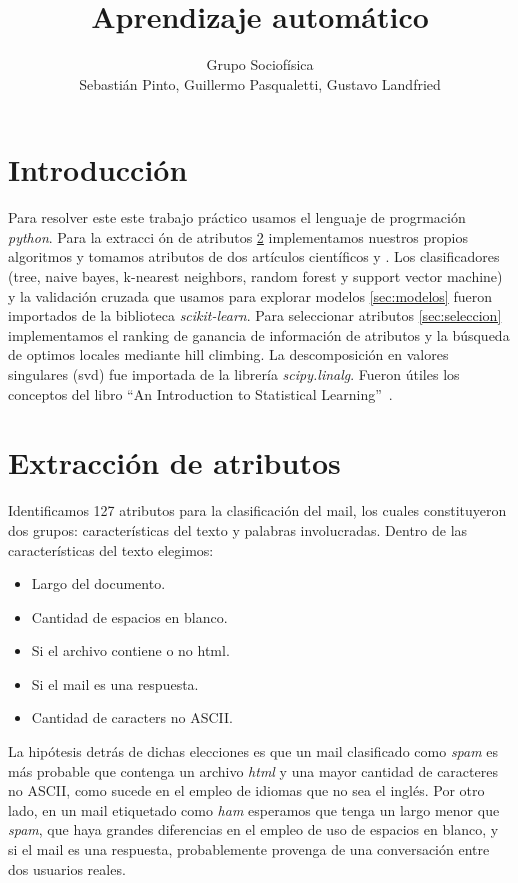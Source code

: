 \documentclass[a4paper,10pt]{article}
\title{Aprendizaje autom\'atico}
\author{Grupo Sociof\'isica \\
Sebasti\'an Pinto, Guillermo Pasqualetti, Gustavo Landfried}
\begin{document}
\maketitle

\section{Introducci\'on}

Para resolver este este trabajo pr\'actico usamos el lenguaje de progrmaci\'on \emph{python}. Para la extracci \'on de atributos \ref{sec:extraccion} implementamos nuestros propios algoritmos y tomamos atributos de dos art\'iculos cient\'ificos \cite{Gunal} y \cite{Vaughan}. Los clasificadores (tree, naive bayes, k-nearest neighbors, random forest y support vector machine) y la validaci\'on cruzada que usamos para explorar modelos \ref{sec:modelos} fueron importados de la biblioteca \emph{scikit-learn}\cite{sklearn}. Para seleccionar atributos \ref{sec:seleccion} implementamos el ranking de ganancia de informaci\'on de atributos y la b\'usqueda de optimos locales mediante hill climbing. La descomposición en valores singulares (svd) fue importada de la librería \emph{scipy.linalg}\cite{scipy}. Fueron \'utiles los conceptos del libro ``An Introduction to Statistical Learning''~\cite{james_hastie_tibshirani}.

\section{Extracci\'on de atributos} \label{sec:extraccion}

\par Identificamos 127 atributos para la clasificación del mail, los cuales constituyeron dos grupos: características del texto y palabras involucradas. Dentro de las características del texto elegimos:
\begin{itemize}
\item Largo del documento.
\item Cantidad de espacios en blanco.
\item Si el archivo contiene o no html.
\item Si el mail es una respuesta.
\item Cantidad de caracters no ASCII.
\end{itemize}

La hipótesis detrás de dichas elecciones es que un mail clasificado como \emph{spam} es más probable que contenga un archivo \emph{html} y una mayor cantidad de caracteres no ASCII, como sucede en el empleo de idiomas que no sea el inglés. Por otro lado, en un mail etiquetado como \emph{ham} esperamos que tenga un largo menor que \emph{spam}, que haya grandes diferencias en el empleo de uso de espacios en blanco, y si el mail es una respuesta, probablemente provenga de una conversación entre dos usuarios reales.
\end{document}
